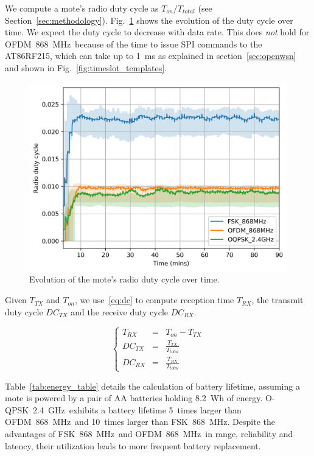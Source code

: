 \documentclass[sensors,article,submit,moreauthors,pdftex]{Definitions/mdpi}
\newcommand{\fsk}           {FSK~868~MHz}
\newcommand{\oqpsk}         {O-QPSK~2.4~GHz}
\newcommand{\ofdm}          {OFDM~868~MHz}
\newcommand{\figwidth}      {0.78}
\begin{document}

We compute a mote's radio duty cycle as $T_{on}/T_{total}$ (see Section~\ref{sec:methodology}).
Fig.~\ref{fig:dutyCycle_time} shows the evolution of the duty cycle over time.
We expect the duty cycle to decrease with data rate.
This does \textit{not} hold for \ofdm\ because of the time to issue SPI commands to the AT86RF215, which can take up to 1~ms as explained in section~\ref{sec:openwsn} and shown in Fig.~\ref{fig:timeslot_templates}.

\begin{figure}
	\centering
	\includegraphics[width=\figwidth\columnwidth]{dutyCycle_time}
	\caption{
	    Evolution of the mote's radio duty cycle over time.
	}
    \label{fig:dutyCycle_time}
\end{figure}

Given $T_{TX}$ and $T_{on}$, we use~\eqref{eq:dc} to compute reception time $T_{RX}$, the transmit duty cycle $DC_{TX}$ and the receive duty cycle $DC_{RX}$.

\begin{equation}
    \left\{
        \begin{array}{lcl}
            T_{RX}  & = & T_{on}-T_{TX}            \\
            DC_{TX} & = & \frac{T_{TX}}{T_{total}} \\
            DC_{RX} & = & \frac{T_{RX}}{T_{total}}
        \end{array}
    \right.
    \label{eq:dc}
\end{equation}

Table~\ref{tab:energy_table} details the calculation of battery lifetime, assuming a mote is powered by a pair of AA batteries holding 8.2~Wh of energy.
\oqpsk\ exhibits a battery lifetime
      5~times larger than \ofdm\ and
     10~times larger than \fsk.
Despite the advantages of \fsk\ and \ofdm\ in range, reliability and latency, their utilization leads to more frequent battery replacement.
\end{document}
